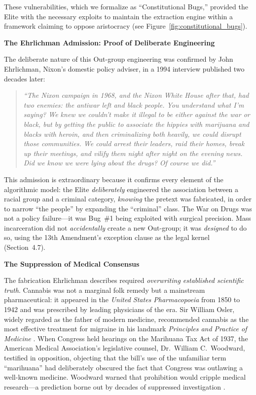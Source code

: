 \documentclass[12pt,openany]{book}
\begin{document}
These vulnerabilities, which we formalize as ``Constitutional Bugs,'' provided the Elite with the necessary exploits to maintain the extraction engine within a framework claiming to oppose aristocracy (see Figure~\ref{fig:constitutional_bugs}).

\textbf{The Ehrlichman Admission: Proof of Deliberate Engineering}

The deliberate nature of this Out-group engineering was confirmed by John Ehrlichman, Nixon's domestic policy adviser, in a 1994 interview published two decades later:

\begin{quote}
\textit{``The Nixon campaign in 1968, and the Nixon White House after that, had two enemies: the antiwar left and black people. You understand what I'm saying? We knew we couldn't make it illegal to be either against the war or black, but by getting the public to associate the hippies with marijuana and blacks with heroin, and then criminalizing both heavily, we could disrupt those communities. We could arrest their leaders, raid their homes, break up their meetings, and vilify them night after night on the evening news. Did we know we were lying about the drugs? Of course we did.''} \cite{baum}
\end{quote}

This admission is extraordinary because it confirms every element of the algorithmic model: the Elite \textit{deliberately} engineered the association between a racial group and a criminal category, \textit{knowing} the pretext was fabricated, in order to narrow ``the people'' by expanding the ``criminal'' class. The War on Drugs was not a policy failure---it was Bug~\#1 being exploited with surgical precision. Mass incarceration did not \textit{accidentally} create a new Out-group; it was \textit{designed} to do so, using the 13th Amendment's exception clause as the legal kernel (Section~4.7).

\textbf{The Suppression of Medical Consensus}

The fabrication Ehrlichman describes required \textit{overwriting established scientific truth}. Cannabis was not a marginal folk remedy but a mainstream pharmaceutical: it appeared in the \textit{United States Pharmacopoeia} from 1850 to 1942 and was prescribed by leading physicians of the era. Sir William Osler, widely regarded as the father of modern medicine, recommended cannabis as the most effective treatment for migraine in his landmark \textit{Principles and Practice of Medicine} \cite{osler}. When Congress held hearings on the Marihuana Tax Act of 1937, the American Medical Association's legislative counsel, Dr.\ William C.\ Woodward, testified in opposition, objecting that the bill's use of the unfamiliar term ``marihuana'' had deliberately obscured the fact that Congress was outlawing a well-known medicine. Woodward warned that prohibition would cripple medical research---a prediction borne out by decades of suppressed investigation \cite{musto, bonnie}.
\end{document}
